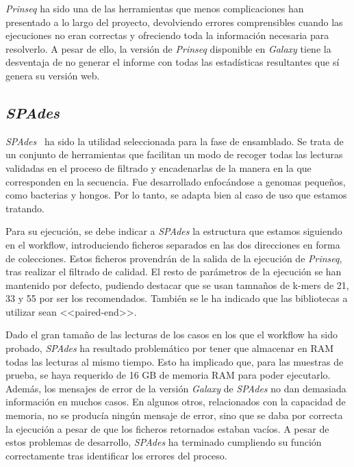 \textit{Prinseq} ha sido una de las herramientas que menos complicaciones han presentado a lo largo del proyecto, devolviendo errores comprensibles cuando las ejecuciones no eran correctas y ofreciendo toda la información necesaria para resolverlo. A pesar de ello, la versión de \textit{Prinseq} disponible en \textit{Galaxy} tiene la desventaja de no generar el informe con todas las estadísticas resultantes que sí genera su versión web.

\subsection{\itshape{SPAdes}}
\textit{SPAdes}~\cite{Nurk2013} ha sido la utilidad seleccionada para la fase de ensamblado. Se trata de un conjunto de herramientas que facilitan un modo de recoger todas las lecturas validadas en el proceso de filtrado y encadenarlas de la manera en la que corresponden en la secuencia. Fue desarrollado enfocándose a genomas pequeños, como bacterias y hongos. Por lo tanto, se adapta bien al caso de uso que estamos tratando.

Para su ejecución, se debe indicar a \textit{SPAdes} la estructura que estamos siguiendo en el workflow, introduciendo ficheros separados en las dos direcciones en forma de colecciones. Estos ficheros provendrán de la salida de la ejecución de \textit{Prinseq}, tras realizar el filtrado de calidad. El resto de parámetros de la ejecución se han mantenido por defecto, pudiendo destacar que se usan tamnaños de k-mers de 21, 33 y 55 por ser los recomendados. También se le ha indicado que las bibliotecas a utilizar sean <<paired-end>>.

Dado el gran tamaño de las lecturas de los casos en los que el workflow ha sido probado, \textit{SPAdes} ha resultado problemático por tener que almacenar en RAM todas las lecturas al mismo tiempo. Esto ha implicado que, para las muestras de prueba, se haya requerido de 16 GB de memoria RAM para poder ejecutarlo. Además, los mensajes de error de la versión \textit{Galaxy} de \textit{SPAdes} no dan demasiada información en muchos casos. En algunos otros, relacionados con la capacidad de memoria, no se producía ningún mensaje de error, sino que se daba por correcta la ejecución a pesar de que los ficheros retornados estaban vacíos. A pesar de estos problemas de desarrollo, \textit{SPAdes} ha terminado cumpliendo su función correctamente tras identificar los errores del proceso. 

